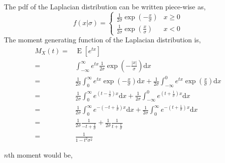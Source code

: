 \documentclass[addpoints]{exam}
\theoremstyle{mytheoremstyle}
\theoremstyle{mytheoremstyle}
\theoremstyle{myproblemstyle}
\begin{document}
\begin{questions}
\begin{parts}
        \begin{solution}
            The pdf of the Laplacian distribution can be written piece-wise as,
            \[
                f(x|\sigma)=\begin{cases}
                    \frac{1}{2\sigma}\exp{\left(-\frac{x}{\sigma}\right)} & x \ge 0 \\
                    \frac{1}{2\sigma}\exp{\left(\frac{x}{\sigma}\right)}  & x < 0
                \end{cases}
            \]
            The moment generating function of the Laplacian distribution is,
            \begin{align*}
                M_{X}(t)= & \operatorname{E}\left[e^{tx}\right]                                                                                                                                                 \\
                =         & \int_{-\infty}^{\infty} e^{tx}\frac{1}{2\sigma}\exp{\left(-\frac{|x|}{\sigma}\right)}\mathrm{d} x                                                                                   \\
                =         & \frac{1}{2\sigma}\int_{0}^{\infty} e^{tx}\exp{\left(-\frac{x}{\sigma}\right)}\mathrm{d} x+\frac{1}{2\sigma}\int_{-\infty}^{0} e^{tx}\exp{\left(\frac{x}{\sigma}\right)}\mathrm{d} x \\
                =         & \frac{1}{2\sigma}\int_{0}^{\infty} e^{\left(t-\frac{1}{\sigma}\right)x}\mathrm{d} x+\frac{1}{2\sigma}\int_{-\infty}^{0} e^{\left(t+\frac{1}{\sigma}\right)x}\mathrm{d} x            \\
                =         & \frac{1}{2\sigma}\int_{0}^{\infty} e^{-\left(-t+\frac{1}{\sigma}\right)x}\mathrm{d} x+\frac{1}{2\sigma}\int_{0}^{\infty} e^{-\left(t+\frac{1}{\sigma}\right)x}\mathrm{d} x          \\
                =         & \frac{1}{2\sigma}\frac{1}{-t+\frac{1}{\sigma}}+\frac{1}{2\sigma}\frac{1}{t+\frac{1}{\sigma}}                                                                                        \\
                =         & \frac{1}{1-t^2\sigma^2}
            \end{align*}

            \(n\)th moment would be,


\end{solution}
\end{parts}
\end{questions}
\end{document}
